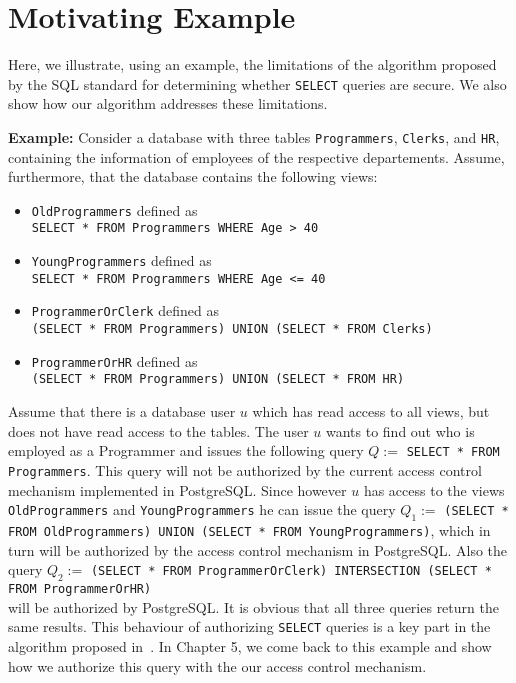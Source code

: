 \section{Motivating Example}

Here, we illustrate, using an example, the limitations of the algorithm proposed by the SQL standard for determining whether \texttt{SELECT} queries are secure.
%
We also show how our algorithm addresses these limitations.


\smallskip
\noindent
{\bf Example:}
%
Consider a database with three tables \texttt{Programmers}, \texttt{Clerks}, and \texttt{HR}, containing the information of employees of the respective departements.
%
Assume, furthermore, that the database contains the following views:
\begin{itemize}
	\item \texttt{OldProgrammers} defined as \\ \texttt{SELECT * FROM Programmers WHERE Age > 40}
	\item \texttt{YoungProgrammers} defined as \\ \texttt{SELECT * FROM Programmers WHERE Age <= 40}
	\item \texttt{ProgrammerOrClerk} defined as \\ \texttt{(SELECT * FROM Programmers) UNION (SELECT * FROM Clerks)}
	\item \texttt{ProgrammerOrHR} defined as \\ \texttt{(SELECT * FROM Programmers) UNION (SELECT * FROM HR)}
\end{itemize}
%
Assume that there is a database user $u$ which has read access to all views, but does not have read access to the tables.
%
The user $u$ wants to find out who is employed as a Programmer and issues the following query $Q := $ \texttt{SELECT * FROM Programmers}. 
%
This query will not be authorized by the current access control mechanism implemented in PostgreSQL.
%
Since however $u$ has access to the views \texttt{OldProgrammers} and \texttt{YoungProgrammers} he can issue the query $Q_1 := $ \texttt{(SELECT * FROM OldProgrammers) UNION (SELECT * FROM YoungProgrammers)}, which in turn will be authorized by the access control mechanism in PostgreSQL.
%
Also the query $Q_2 := $ \texttt{(SELECT * FROM ProgrammerOrClerk) INTERSECTION (SELECT * FROM ProgrammerOrHR)} \\ will be authorized by PostgreSQL.
%
It is obvious that all three queries return the same results.
%
This behaviour of authorizing \texttt{SELECT} queries is a key part in the algorithm proposed in~\cite{guarnieri2016strong}.
%
In Chapter 5, we come back to this example and show how we authorize this query with the our access control mechanism. %
